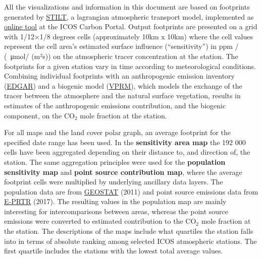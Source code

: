 \documentclass[a4paper,11pt]{article}
\begin{document}
        All the visualizations and information in this document are based on footprints generated by \href{http://stilt-model.org/index.php/Main/HomePage}{STILT}, a lagrangian atmospheric transport model, implemented as \href{https://www.icos-cp.eu/data-services/tools/stilt-footprint}{online tool} at the ICOS Carbon Portal. Output footprints are presented on a grid with 1/12×1/8 degrees cells (approximately 10km x 10km) where the cell values represent the cell area’s estimated surface influence (“sensitivity”) in ppm / (\SI{}{\micro\mol}/ (m²s)) on the atmospheric tracer concentration at the station. The footprints for a given station vary in time according to meteorological conditions. Combining individual footprints with an anthropogenic emission inventory (\href{https://doi.org/10.5194/essd-11-959-2019}{EDGAR}) and a biogenic model (\href{https://doi.org/10.1029/2006GB002735}{VPRM}), which models the exchange of the tracer between the atmosphere and the natural surface vegetation, results in estimates of the anthropogenic emissions contribution, and the biogenic component, on the {\ensuremath{\mathrm{CO_2}}} mole fraction at the station.\newline 

        For all maps and the land cover polar graph, an average footprint for the specified date range has been used. In the \textbf{sensitivity area map} the 192 000 cells have been aggregated depending on their distance to, and direction of, the station. The same aggregation principles were used for the \textbf{population sensitivity map} and \textbf{point source contribution map}, where the average footprint cells were multiplied by underlying ancillary data layers. The population data are from \href{https://ec.europa.eu/eurostat/web/gisco/geodata/reference-data/population-distribution-demography/geostat}{GEOSTAT} (2011) and point source emissions data from \href{https://www.eea.europa.eu/data-and-maps/data/member-states-reporting-art-7-under-the-european-pollutant-release-and-transfer-register-e-prtr-regulation-22}{E-PRTR} (2017). The resulting values in the population map are mainly interesting for intercomparisons between areas, whereas the point source emissions were converted to estimated contribution to the {\ensuremath{\mathrm{CO_2}}} mole fraction at the station. The descriptions of the maps include what quartiles the station falls into in terms of absolute ranking among selected ICOS atmospheric stations. The first quartile includes the stations with the lowest total average values. \newline
\end{document}
